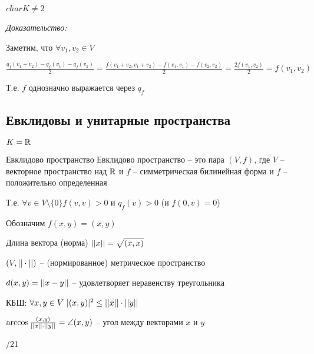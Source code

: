 \documentclass[12pt]{article}
\begin{document}
\begin{Remark}{}
    $char K \neq 2$
\end{Remark}

\textit{Доказательство:}

Заметим, что $\forall v_1, v_2 \in V$

$\frac{q_f(v_1 + v_2) - q_f(v_1) - q_f(v_2)}{2} = \frac{f(v_1 + v_2, v_1 + v_2) -f(v_1, v_1) - f(v_2, v_2)}{2} = \frac{2f(v_1, v_2)}{2} = f(v_1, v_2)$

Т.е. $f$ однозначно выражается через $q_f$

\subsection{Евклидовы и унитарные пространства}

$K = \mathbb R$

\begin{defin}{Евклидово пространство}
    Евклидово пространство -- это пара $(V, f)$, где $V$ -- векторное пространство над $\mathbb R$ и $f$ -- симметрическая билинейная форма и $f$ -- положительно определенная

    Т.е. $\forall v \in V\setminus\{0\} f(v, v) > 0$ и $q_f(v) > 0$ (и $f(0, v) = 0$)
\end{defin}

\begin{nota}{}
    Обозначим $f(x, y) = (x, y)$
\end{nota}

\begin{defin}{Длина вектора (норма)}
    $|| x || = \sqrt{(x, x)}$

    $(V, || \cdot ||)$ -- (нормированное) метрическое пространство

    $d(x, y) = || x - y ||$ -- удовлетворяет неравенству треугольника

    КБШ: $\forall x, y \in V\ |(x, y)|^2 \leq || x || \cdot || y ||$

    $\arccos{\frac{(x, y)}{|| x || \cdot || y ||}} = \angle(x, y)$ -- угол между векторами $x$ и $y$
\end{defin}

/21
\end{document}
